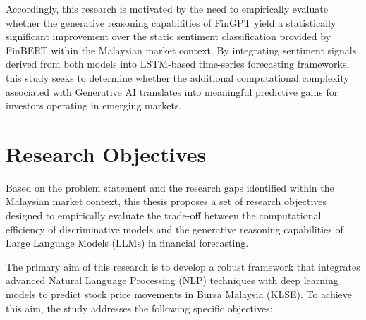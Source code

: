 \documentclass[singlespace]{ucetd}
\begin{document}
Accordingly, this research is motivated by the need to empirically evaluate whether the generative reasoning capabilities of FinGPT yield a statistically significant improvement over the static sentiment classification provided by FinBERT within the Malaysian market context. By integrating sentiment signals derived from both models into LSTM-based time-series forecasting frameworks, this study seeks to determine whether the additional computational complexity associated with Generative AI translates into meaningful predictive gains for investors operating in emerging markets.

\section{Research Objectives}

Based on the problem statement and the research gaps identified within the Malaysian market context, this thesis proposes a set of research objectives designed to empirically evaluate the trade-off between the computational efficiency of discriminative models and the generative reasoning capabilities of Large Language Models (LLMs) in financial forecasting.

The primary aim of this research is to develop a robust framework that integrates advanced Natural Language Processing (NLP) techniques with deep learning models to predict stock price movements in Bursa Malaysia (KLSE). To achieve this aim, the study addresses the following specific objectives:
\end{document}
